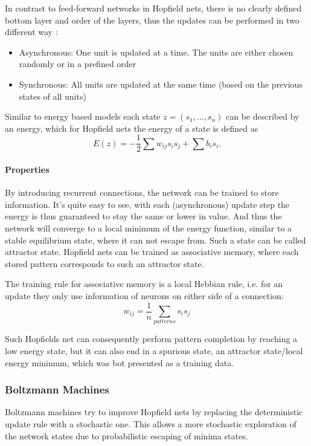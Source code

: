 In contrast to feed-forward networks in Hopfield nets, there is no clearly defined bottom layer and order of the layers, thus the updates can be performed in two different way :
\begin{itemize}
\item Asynchronous: One unit is updated at a time. The units are either chosen randomly or in a prefined order
\item Synchronous: All units are updated at the same time (based on the previous states of all units)
\end{itemize}

Similar to energy based models each state $z = (s_1, ... , s_n)$ can be described by an energy, which for Hopfield nets the energy of a state is defined as  
\[
E(z) = - \frac{1}{2} \sum w_{ij} s_i s_j + \sum b_i s_i .
\]

\paragraph{Properties}

By introducing recurrent connections, the network can be trained to store information.
It's quite easy to see, with each (asynchronous) update step the energy is thus guaranteed to stay the same or lower in value.
And thus the network will converge to a local minimum of the energy function, similar to a stable equilibrium state, where it can not escape from. 
Such a state can be called attractor state.
Hopfield nets can be trained as associative memory, where each stored pattern corresponds to such an attractor state.

The training rule for associative memory is a local Hebbian rule, i.e. for an update they only use information of neurons on either side of a connection:
\[
w_{ij} = \frac{1}{n} \sum_{patterns} s_{i} s_{j}
\]

Such Hopfields net can consequently perform pattern completion by reaching a low energy state, but it can also end in a spurious state, an attractor state/local energy minimum, which was bot presented as a training data.


\subsubsection{Boltzmann Machines}

Boltzmann machines try to improve Hopfield nets by replacing the deterministic update rule with a stochastic one.
This allows a more stochastic exploration of the network states due to probabilistic escaping of minima states.

